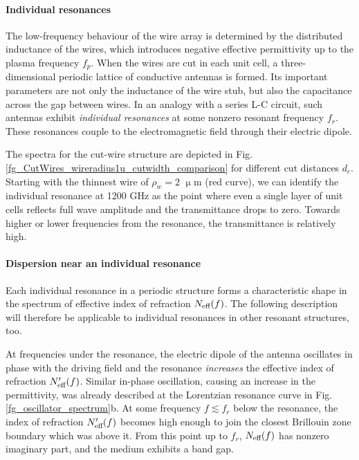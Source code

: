 \paragraph{Individual resonances}
The low-frequency behaviour of the wire array is determined by the distributed inductance of the wires, which introduces negative effective permittivity up to the plasma frequency $f_p$. When the wires are cut in each unit cell, a three-dimensional periodic lattice of conductive antennas is formed. Its important parameters are not only the inductance of the wire stub, but also the capacitance across the gap between wires. In an analogy with a series L-C circuit, such antennas exhibit \textit{individual resonances} at some nonzero resonant frequency $f_r$. These resonances couple to the electromagnetic field through their electric dipole.

The spectra for the cut-wire structure are depicted in Fig. \ref{fg_CutWires_wireradius1u_cutwidth_comparison} for different cut distances $d_c$. Starting with the thinnest wire of $\rho_w = 2$ $\upmu$m (red curve), we can identify the individual resonance at 1200 GHz as the point where even a single layer of unit cells reflects full wave amplitude and the transmittance drops to zero. Towards higher or lower frequencies from the resonance, the transmittance is relatively high.

\paragraph{Dispersion near an individual resonance}
Each individual resonance in a periodic structure forms a characteristic shape in the spectrum of effective index of refraction $N_{\text{eff} }(f)$. The following description will therefore be applicable to individual resonances in other resonant structures, too. 

At frequencies under the resonance, the electric dipole of the antenna oscillates in phase with the driving field and the resonance \textit{increases} the effective index of refraction $N_{\text{eff} }'(f)$. 
Similar in-phase oscillation, causing an increase in the permittivity, was already described at the Lorentzian resonance curve in Fig. \ref{fg_oscillator_spectrum}b. 
At some frequency $f \lesssim f_r$ below the resonance, the index of refraction $N_{\text{eff} }'(f)$ becomes high enough to join the closest Brillouin zone boundary which was above it. From this point up to $f_r$, $N_{\text{eff} }(f)$ has nonzero imaginary part, and the medium exhibits a band gap.

